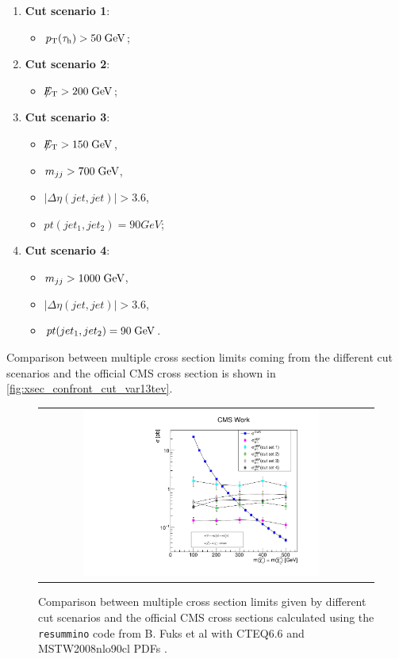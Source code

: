 \begin{enumerate}
	\item \textbf{Cut scenario 1}: 
		\begin{itemize}
		\item $p_{\text{T}}(\tau_{\text{h}}) > 50\;\text{Ge}\kern-0.06667em\text{V}$;
	\end{itemize}

	\item \textbf{Cut scenario 2}: 
	\begin{itemize}
		\item 	$\slash\mkern-12mu{E}_{\text{T}} > 200\;\text{Ge}\kern-0.06667em\text{V}$;
	\end{itemize}

	\item \textbf{Cut scenario 3}: 
	\begin{itemize}
		\item $\slash\mkern-12mu{E}_{\text{T}} > 150\;\text{Ge}\kern-0.06667em\text{V}$,
		\item $m_{jj} > 700\;\text{Ge}\kern-0.06667em\text{V}$, 
		\item $|\Delta\eta(jet,jet)| > 3.6$,
		\item $pt (jet_{1},jet_{2}) = 90 GeV$;
	\end{itemize}
	
	\item \textbf{Cut scenario 4}: 			
	\begin{itemize}
		\item $m_{jj} > 1000\;\text{Ge}\kern-0.06667em\text{V}$, 
		\item $|\Delta\eta(jet,jet)| > 3.6$,
		\item $pt (jet_{1},jet_{2}) = 90\;\text{Ge}\kern-0.06667em\text{V}$.
	\end{itemize}
\end{enumerate}

Comparison between multiple cross section limits coming from the different cut scenarios and the official CMS cross section is shown in \autoref{fig:xsec_confront_cut_var13tev}.

\begin{figure}[tbh!]
	\centering
	\begin{tabular}{cc}
		\includegraphics[width=0.75\textwidth]{analysis/pics/out_xsecmin_cutvar.pdf}
	\end{tabular}
	\caption{Comparison between multiple cross section limits given by different cut scenarios and the official CMS cross sections calculated using the \texttt{resummino} code from B. Fuks et al with CTEQ6.6 and MSTW2008nlo90cl PDFs \cite{Fuks:2013vua}.}
	\label{fig:xsec_confront_cut_var13tev}
\end{figure}

